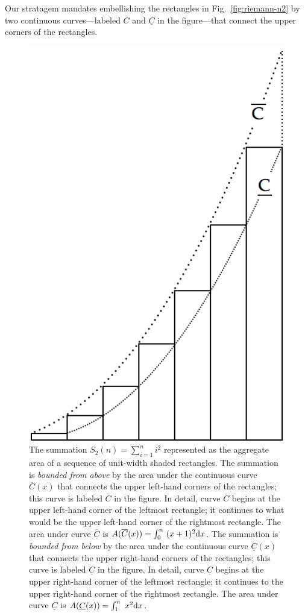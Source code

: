 \begin{enumerate}
Our stratagem mandates embellishing the rectangles in Fig.~\ref{fig:riemann-n2} by two continuous curves---labeled $\overline{C}$ and $\underline{C}$ in the figure---that connect the upper corners of the rectangles.
\begin{figure}[htb]
\centerline{
\includegraphics[scale=0.3]{FiguresMaths/SumSquaresContinuous}
}
\caption{The summation $S_2(n) = \sum_{i=1}^n i^2$ represented as the aggregate area of a sequence of unit-width shaded rectangles.  The summation is {\em bounded from above} by the area under the continuous curve $\overline{C}(x)$ that connects the upper left-hand corners of the rectangles; this curve is labeled $\overline{C}$ in the figure.  In detail, curve $\overline{C}$ begins at the upper left-hand corner of the leftmost rectangle; it continues to what would be the upper left-hand corner of the rightmost rectangle.  The area under curve $\overline{C}$ is $A(\overline{C}(x)) = \int_0^n \ (x+1)^2 {\rm d}x$.  The summation is {\em bounded from below} by the area under the continuous curve $\underline{C}(x)$ that connects the upper right-hand corners of the rectangles; this curve is labeled $\underline{C}$ in the figure.  In detail, curve $\underline{C}$ begins at the upper right-hand corner of the leftmost rectangle; it continues to the upper right-hand corner of the rightmost rectangle.  The area under curve $\underline{C}$ is $A(\underline{C}(x)) = \int_1^n \ x^2 {\rm d}x$.}

\end{figure}
\end{enumerate}

